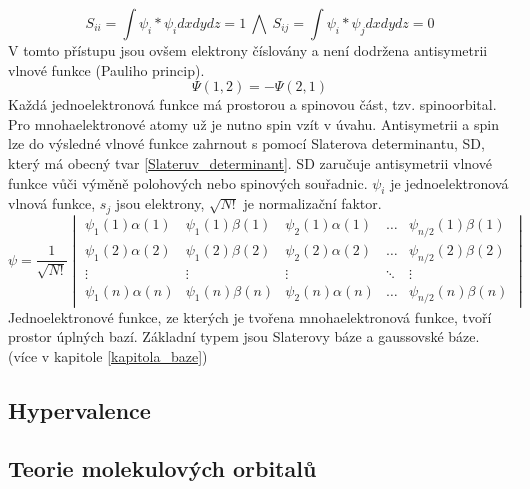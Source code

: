 \documentclass[
  digital, %
  table,   %
  lof,     %
  lot,     %
]{fithesis3}
\begin{document}
\begin{equation}
S_{ii} = \int \psi_i * \psi_i dx dy dz = 1 ~ \bigwedge ~ S_{ij} = \int \psi_i * \psi_j dx dy dz = 0
\end{equation}
V tomto přístupu jsou ovšem elektrony číslovány a není dodržena antisymetrii vlnové funkce (Pauliho princip). \cite{warren1986ab}
\begin{equation}
\Psi (1,2) = - \Psi (2,1)
\label{Paulliho_princip}
\end{equation}
 Každá jednoelektronová funkce má prostorou a spinovou část, tzv. spinoorbital. Pro mnohaelektronové atomy už je nutno spin vzít v úvahu. Antisymetrii a spin lze do výsledné vlnové funkce zahrnout s pomocí Slaterova determinantu, SD, který má obecný tvar \ref{Slateruv_determinant}. SD zaručuje antisymetrii vlnové funkce vůči výměně polohových nebo spinových souřadnic. $\psi_i$ je jednoelektronová vlnová funkce, $s_j$ jsou elektrony, $\sqrt{N!}$ je normalizační faktor.
\begin{equation}
\psi =  \frac{1}{\sqrt{N!}}\begin{vmatrix}
\psi_1(1)\alpha(1) & \psi_1(1) \beta (1) & \psi_2(1)\alpha(1) & \dots & \psi_{n/2}(1)\beta(1) \\
\psi_1(2)\alpha(2) & \psi_1(2) \beta (2) & \psi_2(2)\alpha(2) & \dots & \psi_{n/2}(2)\beta(2) \\
\vdots             & \vdots              & \vdots             & \ddots & \vdots \\
\psi_1(n)\alpha(n) & \psi_1(n) \beta (n) & \psi_2(n)\alpha(n) & \dots & \psi_{n/2}(n)\beta(n) 
\end{vmatrix}
\label{Slateruv_determinant}
\end{equation}
Jednoelektronové funkce, ze kterých je tvořena mnohaelektronová funkce, tvoří prostor úplných bazí. Základní typem jsou Slaterovy báze a gaussovské báze. (více v kapitole \ref{kapitola_baze})




\subsection{Hypervalence}
\subsection{Teorie molekulových orbitalů}
\end{document}
